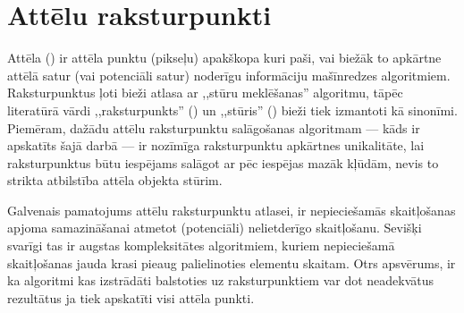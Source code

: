 \section{Attēlu raksturpunkti} \label{sec:algo}
Attēla  () ir attēla punktu (pikseļu)
apakškopa kuri paši, vai biežāk to apkārtne attēlā 
satur (vai potenciāli satur) noderīgu informāciju mašīnredzes algoritmiem.
Raksturpunktus ļoti bieži atlasa ar ,,stūru meklēšanas'' algoritmu,
tāpēc literatūrā vārdi ,,raksturpunkts'' () un ,,stūris''
() bieži tiek izmantoti kā sinonīmi. Piemēram, dažādu attēlu
raksturpunktu salāgošanas algoritmam --- kāds ir apskatīts šajā darbā ---
ir nozīmīga raksturpunktu apkārtnes unikalitāte,
lai raksturpunktus būtu iespējams salāgot ar pēc iespējas mazāk kļūdām,
nevis to strikta atbilstība attēla objekta stūrim.

Galvenais pamatojums attēlu raksturpunktu atlasei, ir nepieciešamās
skaitļošanas apjoma samazināšanai atmetot (potenciāli) nelietderīgo
skaitļošanu. Sevišķi svarīgi tas ir augstas kompleksitātes algoritmiem,
kuriem nepieciešamā skaitļošanas jauda krasi pieaug palielinoties
elementu skaitam. Otrs apsvērums, ir ka algoritmi kas izstrādāti balstoties
uz raksturpunktiem var dot neadekvātus rezultātus ja tiek apskatīti visi
attēla punkti.



